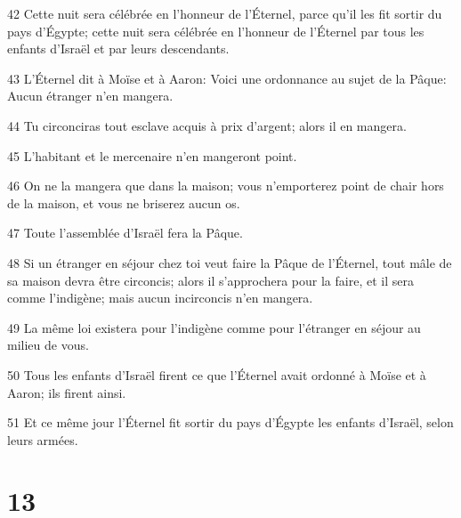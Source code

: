 \par 42 Cette nuit sera célébrée en l'honneur de l'Éternel, parce qu'il les fit sortir du pays d'Égypte; cette nuit sera célébrée en l'honneur de l'Éternel par tous les enfants d'Israël et par leurs descendants.
\par 43 L'Éternel dit à Moïse et à Aaron: Voici une ordonnance au sujet de la Pâque: Aucun étranger n'en mangera.
\par 44 Tu circonciras tout esclave acquis à prix d'argent; alors il en mangera.
\par 45 L'habitant et le mercenaire n'en mangeront point.
\par 46 On ne la mangera que dans la maison; vous n'emporterez point de chair hors de la maison, et vous ne briserez aucun os.
\par 47 Toute l'assemblée d'Israël fera la Pâque.
\par 48 Si un étranger en séjour chez toi veut faire la Pâque de l'Éternel, tout mâle de sa maison devra être circoncis; alors il s'approchera pour la faire, et il sera comme l'indigène; mais aucun incirconcis n'en mangera.
\par 49 La même loi existera pour l'indigène comme pour l'étranger en séjour au milieu de vous.
\par 50 Tous les enfants d'Israël firent ce que l'Éternel avait ordonné à Moïse et à Aaron; ils firent ainsi.
\par 51 Et ce même jour l'Éternel fit sortir du pays d'Égypte les enfants d'Israël, selon leurs armées.

\chapter{13}

